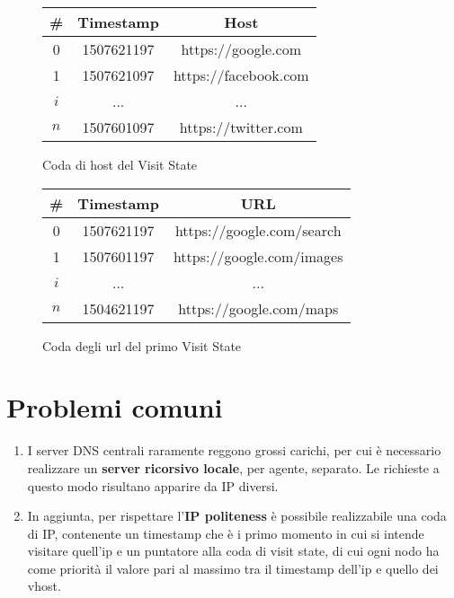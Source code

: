 \documentclass[\main/main.tex]{subfiles}
\begin{document}
\begin{figure}[H]
\begin{center}
\begin{tabular}{|c|c|c|}
	\hline
	\# & Timestamp & Host\\
	\hline
	0 & 1507621197 & https://google.com\\
	\hline
	1 & 1507621097 & https://facebook.com\\
	\hline
	$i$ & ... & ... \\
	\hline
	$n$ & 1507601097 & https://twitter.com\\
	\hline
\end{tabular}
\end{center}
\caption{Coda di host del Visit State}
\end{figure}

\begin{figure}[H]
\begin{center}
\begin{tabular}{|c|c|c|}
	\hline
	\# & Timestamp & URL\\
	\hline
	0 & 1507621197 & https://google.com/search\\
	\hline
	1 & 1507601197 & https://google.com/images\\
	\hline
	$i$ & ... & ... \\
	\hline
	$n$ & 1504621197 & https://google.com/maps\\
	\hline
\end{tabular}
\end{center}
\caption{Coda degli url del primo Visit State}
\end{figure}

\section{Problemi comuni}

\begin{enumerate}
\item I server DNS centrali raramente reggono grossi carichi, per cui è necessario realizzare un \textbf{server ricorsivo locale}, per agente, separato. Le richieste a questo modo risultano apparire da IP diversi.
\item In aggiunta, per rispettare l'\textbf{IP politeness} è possibile realizzabile una coda di IP, contenente un timestamp che è i primo momento in cui si intende visitare quell'ip e un puntatore alla coda di visit state, di cui ogni nodo ha come priorità il valore pari al massimo tra il timestamp dell'ip e quello dei vhost.
\end{enumerate}
\end{document}
